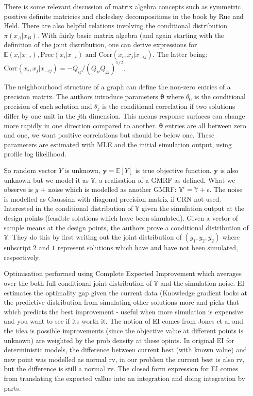 \message{ !name(SO-Methods.tex)}\documentclass{article}
\begin{document}
There is some relevant discussion of matrix algebra concepts such as symmetric positive definite matricies and choleskey decompositions in the book by Rue and Held. There are also helpful relations involving the conditional distribution $\pi(x_A|x_B)$. With fairly basic matrix algebra (and again starting with the definition of the joint distribution, one can derive expressions for $\mathbb{E}(x_i|x_{-i}), \text{Prec}(x_i|x_{-i})$ and $\text{Corr}(x_i,x_j|x_{-ij})$. The latter being: $\text{Corr}(x_i,x_j|x_{-ij}) = -Q_{ij}/(Q_{ii}Q_{jj})^{1/2}$. \newline

The neighbourhood structure of a graph can define the non-zero entries of a precision matrix. The authors introduce parameters $\boldsymbol{\theta}$ where $\theta_0$ is the conditional precision of each solution and $\theta_j$ is the conditional correlation if two solutions differ by one unit in the $j$th dimension. This means response surfaces can change more rapidly in one direction compared to another. $\boldsymbol{\theta}$ entries are all between zero and one, we want positive correlations but should be below one. These parameters are estimated with MLE and the initial simulation output, using profile log likelihood. \newline

So random vector $Y$ is unknown, $\boldsymbol{y}=\mathbb{E}[Y]$ is true objective function. $\boldsymbol{y}$ is also unknown but we model it as $\mathbb{Y}$, a realisation of a GMRF as defined. What we observe is $y$ + noise which is modelled as another GMRF: $\mathbb{Y}^{\epsilon} = \mathbb{Y} + \epsilon$. The noise is modelled as Gaussian with diagonal precision matrix if CRN not used. Interested in the conditional distribution of $\mathbb{Y}$ given the simulation output at the design points (feasible solutions which have been simulated). Given a vector of sample means at the design points, the authors prove a conditional distribution of $\mathbb{Y}$. They do this by first writing out the joint distribution of $(y_1,y_2,y_2^{\epsilon})$ where subscript $2$ and $1$ represent solutions which have and have not been simulated, respectively.\newline

Optimisation performed using Complete Expected Improvement which averages over the both full conditional joint distribution of $\mathbb{Y}$ and the simulation noise. EI estimates the optimality gap given the current data (Knowledge gradient looks at the predictive distribution from simulating other solutions more and picks that which predicts the best improvement - useful when more simulation is expensive and you want to see if its worth it. The notion of EI comes from Jones et al and the idea is possible improvements (since the objective value at different points is unknown) are weighted by the prob density at these opints. In original EI for deterministic models, the difference between current best (with known value) and new point was modelled as normal rv, in our problem the current best is also rv, but the difference is still a normal rv. The closed form expression for EI comes from translating the expected vallue into an integration and doing integration by parts. \newline
\end{document}
